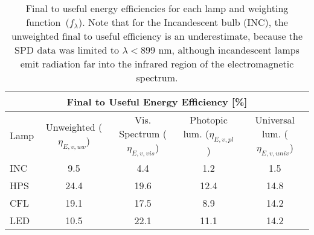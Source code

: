 

\begin{table}
\centering %
\caption{Final to useful energy efficiencies for each lamp and weighting function~($f_\lambda$). 
Note that for the Incandescent bulb (INC),
the unweighted final to useful efficiency is an underestimate, because
the SPD data was limited to $\lambda < 899 \text{ nm}$, 
although incandescent lamps emit radiation far into the infrared region of the electromagnetic spectrum.}
\begin{tabular}{l c c c c}
\toprule
\multicolumn{5}{c}{Final to Useful Energy Efficiency [\%]} \\
\midrule
  Lamp 
      & Unweighted ($\eta_{E,v,uw}$)
      & Vis. Spectrum ($\eta_{E,v,vis}$)
      & Photopic lum. ($\eta_{E,v,pl}$)
      & Universal lum. ($\eta_{E,v,univ}$)  \\
\midrule
  INC & 9.5 & 4.4 & 1.2 & 1.5 \\
  HPS & 24.4 & 19.6 & 12.4 & 14.8 \\
  CFL & 19.1 & 17.5 & 8.9 & 14.2 \\
  LED & 10.5 & 22.1 & 11.1 & 14.2 \\
\bottomrule
\end{tabular}
\label{tab:results_etas}
\end{table}
